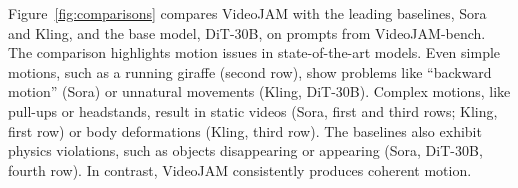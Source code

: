 Figure~\ref{fig:comparisons} compares VideoJAM with the leading baselines, Sora and Kling, and the base model, DiT-30B, on prompts from VideoJAM-bench. The comparison highlights motion issues in state-of-the-art models. Even simple motions, such as a running giraffe (second row), show problems like ``backward motion'' (Sora) or unnatural movements (Kling, DiT-30B). Complex motions, like pull-ups or headstands, result in static videos (Sora, first and third rows; Kling, first row) or body deformations (Kling, third row). The baselines also exhibit physics violations, such as objects disappearing or appearing (Sora, DiT-30B, fourth row). In contrast, VideoJAM consistently produces coherent motion.



\begin{table}[t!]
\vspace{-8px}
    \caption{\textbf{Comparison of VideoJAM-4B with prior work on VideoJAM-bench.} Human evaluation shows \emph{percentage of votes favoring VideoJAM}; automatic metrics use VBench.}
  \label{tab:4b}
  \centering
  \setlength{\tabcolsep}{3.5pt}
    \vspace{-16px}
\end{table}


